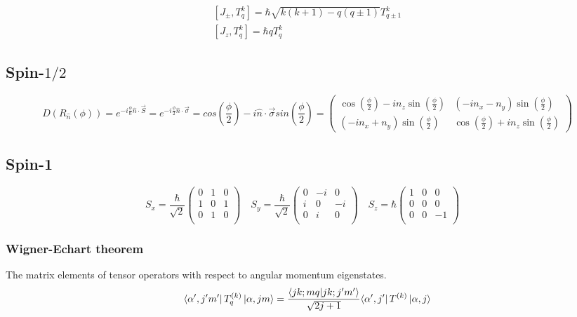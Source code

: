\begin{equation}
    \begin{gathered}
	[J_{\pm}, T^k_q] = \hbar\sqrt{k(k+1) -q(q\pm 1)}T^k_{q\pm 1}    \\
	[J_z, T^k_q] = \hbar qT^k_q
    \end{gathered}
\end{equation}
\subsection{Spin-$1/2$} 
\[ 
D(R_{\hat{n}}(\phi)) = e^{-i\frac{\phi}{\hbar}\hat{n}\cdot\vec{S}} = e^{-i\frac{\phi}{2}\hat{n}\cdot\vec{\sigma}} = 
cos(\frac{\phi}{2}) - i \hat{n} \cdot \vec{\sigma} sin(\frac{\phi}{2}) = 
\begin{pmatrix}
    \cos(\frac{\phi}{2}) - in_{z}\sin(\frac{\phi}{2}) & (-i n_{x} - n_{y})\sin(\frac{\phi}{2}) \\ 
    (-i n_{x} + n_{y})\sin(\frac{\phi}{2}) &  \cos(\frac{\phi}{2}) + in_{z}\sin(\frac{\phi}{2})  
\end{pmatrix}
\]

\subsection{Spin-1}
\begin{equation}
    S_x=\frac{\hbar}{\sqrt{2}}
    \begin{pmatrix}
	0   & 1	& 0 \\
	1   & 0	& 1 \\
	0   & 1	& 0 \\
    \end{pmatrix}\quad
    S_y=\frac{\hbar}{\sqrt{2}}
    \begin{pmatrix}
	0   & -i    & 0 \\
	i   & 0	& -i \\
	0   & i	& 0 \\
    \end{pmatrix}\quad
    S_z=\hbar
    \begin{pmatrix}
	1   & 0	& 0 \\
	0   & 0	& 0 \\
	0   & 0	& -1 \\
    \end{pmatrix}\quad
\end{equation}

\subsubsection{Wigner-Echart theorem}
The matrix elements of tensor operators with respect to angular momentum
eigenstates.
\begin{equation}
    \bra{\alpha^\prime,j^{\prime}m^\prime}T^{(k)}_{q}\ket{\alpha,jm}
    =\frac{\bra{jk;mq}\ket{jk;j^{\prime}m^\prime}}{\sqrt{2j+1}}{\bra{\alpha^\prime,j^\prime}T^{(k)}\ket{\alpha,j}}
\end{equation}

